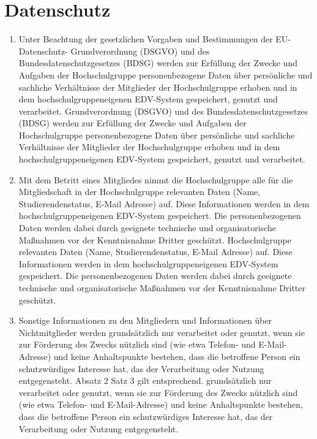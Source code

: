 \documentclass[11pt]{article}
\begin{document}
\section{Datenschutz}
\begin{enumerate}
	\item Unter Beachtung der gesetzlichen Vorgaben und Bestimmungen der EU-Datenschutz-
	      Grundverordnung (DSGVO) und des Bundesdatenschutzgesetzes (BDSG) werden zur Erfüllung
	      der Zwecke und Aufgaben der Hochschulgruppe personenbezogene Daten über persönliche und
	      sachliche Verhältnisse der Mitglieder der Hochschulgruppe erhoben und in dem
	      hochschulgruppeneigenen EDV-System gespeichert, genutzt und verarbeitet.
	      Grundverordnung (DSGVO) und des Bundesdatenschutzgesetzes (BDSG) werden zur Erfüllung
	      der Zwecke und Aufgaben der Hochschulgruppe personenbezogene Daten über persönliche und
	      sachliche Verhältnisse der Mitglieder der Hochschulgruppe erhoben und in dem
	      hochschulgruppeneigenen EDV-System gespeichert, genutzt und verarbeitet.
	\item Mit dem Betritt eines Mitgliedes nimmt die Hochschulgruppe alle für die Mitgliedschaft in der
	      Hochschulgruppe relevanten Daten (Name, Studierendenstatus, E-Mail Adresse) auf. Diese Informationen
	      werden in dem hochschulgruppeneigenen EDV-System gespeichert. Die personenbezogenen
	      Daten werden dabei durch geeignete technische und organisatorische Maßnahmen vor der
	      Kenntnisnahme Dritter geschützt.
	      Hochschulgruppe relevanten Daten (Name, Studierendenstatus, E-Mail Adresse) auf. Diese Informationen
	      werden in dem hochschulgruppeneigenen EDV-System gespeichert. Die personenbezogenen
	      Daten werden dabei durch geeignete technische und organisatorische Maßnahmen vor der
	      Kenntnisnahme Dritter geschützt.
	\item Sonstige Informationen zu den Mitgliedern und Informationen über Nichtmitglieder werden
	      grundsätzlich nur verarbeitet oder genutzt, wenn sie zur Förderung des Zwecks nützlich sind
	      (wie etwa Telefon- und E-Mail-Adresse) und keine Anhaltspunkte bestehen, dass die betroffene
	      Person ein schutzwürdiges Interesse hat, das der Verarbeitung oder Nutzung entgegensteht.
	      Absatz 2 Satz 3 gilt entsprechend.
	      grundsätzlich nur verarbeitet oder genutzt, wenn sie zur Förderung des Zwecks nützlich sind
	      (wie etwa Telefon- und E-Mail-Adresse) und keine Anhaltspunkte bestehen, dass die betroffene
	      Person ein schutzwürdiges Interesse hat, das der Verarbeitung oder Nutzung entgegensteht.

\end{enumerate}
\end{document}
